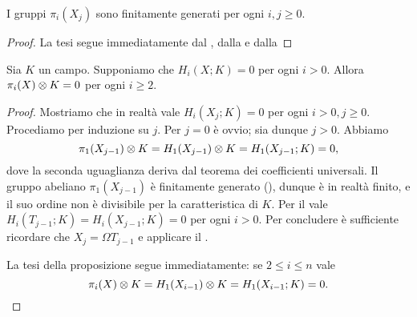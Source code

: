 \begin{corollary}
I gruppi \(\pi_i(X_j)\) sono finitamente generati per ogni \(i,j\ge 0\).
\end{corollary}
\begin{proof}
La tesi segue immediatamente dal , dalla  e dalla 
\end{proof}

\begin{proposition}
Sia \(K\) un campo. Supponiamo che \(H_i(X;K)=0\) per ogni \(i>0\). Allora \(\pi_i(X)\mathbin{\otimes} K=0\) per ogni \(i\ge 2\).
\end{proposition}
\begin{proof}
Mostriamo che in realtà vale \(H_i(X_j;K)=0\) per ogni \(i>0,j\ge 0\). Procediamo per induzione su \(j\). Per \(j=0\) è ovvio; sia dunque \(j>0\). Abbiamo
\[
\pi_1(X_{j-1})\mathbin{\otimes} K=H_1(X_{j-1})\mathbin{\otimes} K=H_1(X_{j-1};K)=0,
\]
dove la seconda uguaglianza deriva dal teorema dei coefficienti universali. Il gruppo abeliano \(\pi_1(X_{j-1})\) è finitamente generato (), dunque è in realtà finito, e il suo ordine non è divisibile per la caratteristica di \(K\). Per il  vale \(H_i(T_{j-1};K)=H_i(X_{j-1};K)=0\) per ogni \(i>0\). Per concludere è sufficiente ricordare che \(X_j=\Omega T_{j-1}\) e applicare il .

La tesi della proposizione segue immediatamente: se \(2\le i\le n\) vale
\[
\pi_i(X)\mathbin{\otimes} K=H_1(X_{i-1})\mathbin{\otimes} K=H_1(X_{i-1};K)=0.\qedhere
\]
\end{proof}

